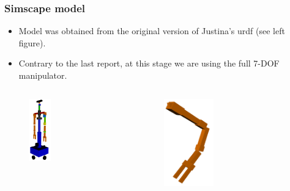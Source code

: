 \documentclass[9pt,spanish,aspectratio=1610]{beamer}
\begin{document}
\begin{frame}\frametitle{Simscape model}
  \begin{itemize}
  \item Model was obtained from the original version of Justina's urdf (see left figure). 
  \item Contrary to the last report, at this stage we are using the full 7-DOF manipulator. 
  \end{itemize}
  \begin{columns}
    \begin{column}{0.5\textwidth}
      \begin{figure}
        \centering
        \includegraphics[width=0.3\textwidth]{Figures/justina_urdf.png}
      \end{figure}
    \end{column}
    \begin{column}{0.5\textwidth}
      \begin{figure}
        \centering
        \includegraphics[width=0.4\textwidth]{Figures/left_arm.png}
      \end{figure}
    \end{column}
  \end{columns}
\end{frame}
\end{document}
